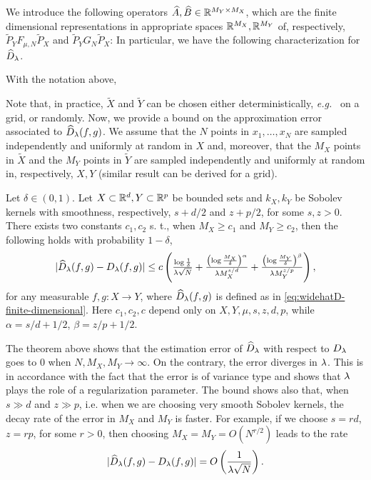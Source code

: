 We introduce the following operators $\widehat{A}, \widehat{B} \in \mathbb R^{M_Y \times M_X}$, which are the finite dimensional representations in appropriate spaces $\mathbb R^{M_X}, \mathbb R^{M_Y}$ of, respectively, $\tilde{P}_Y F_{\mu, N} \tilde{P}_X$ and $\tilde{P}_Y G_N \tilde{P}_X$:
In particular, we have the following characterization for $\widehat{D}_\lambda$.
\begin{lemma}\label{lm:widehatD}
With the notation above,
\end{lemma}

Note that, in practice, $\widetilde X$ and $\widetilde Y$ can be chosen either deterministically, \emph{e.g.\ } on a grid, or randomly. Now, we provide a bound on the approximation error associated to $\widehat{D}_\lambda(f,g)$. We assume that the $N$ points in $x_1,\dots, x_N$ are sampled independently and uniformly at random in $X$ and, moreover, that the $M_X$ points in $\widetilde{X}$ and the $M_Y$ points in $\widetilde{Y}$ are sampled independently and uniformly at random in, respectively, $X, Y$ (similar result can be derived for a grid).
\begin{theorem}\label{thm:appr-error-widehatD}
Let $\delta \in (0,1)$. Let $X \subset \mathbb R^d, Y \subset \mathbb R^p$ be bounded sets and $k_X, k_Y$ be Sobolev kernels with smoothness, respectively, $s + d/2$ and $z+p/2$, for some $s,z > 0$. There exists two constants $c_1, c_2$ s. t., when $M_X \geq c_1$ and $M_Y \geq c_2$, then the following holds with probability $1-\delta$,
$$|\widehat{D}_\lambda(f,g) - D_\lambda(f,g)| \leq c\left(\tfrac{\log\frac{1}{\delta}}{\lambda\sqrt{N}} + \tfrac{\left(\log \frac{M_X}{\delta}\right)^{\alpha}}{\lambda M_X^{s/d}} + \tfrac{\left(\log\frac{M_Y}{\delta}\right)^{\beta}}{\lambda M_Y^{z/p}}\right),$$
for any measurable $f,g : X \to Y$, where $\widehat{D}_\lambda(f,g)$ is defined as in \cref{eq:widehatD-finite-dimensional}. Here $c_1, c_2, c$ depend only on $X, Y, \mu, s, z, d, p$, while $\alpha = s/d+1/2$, $\beta = z/p+1/2$.
\end{theorem}

The theorem above shows that the estimation error of $\widehat{D}_\lambda$ with respect to $D_\lambda$ goes to $0$ when $N, M_X, M_Y \to \infty$. On the contrary, the error diverges in $\lambda$. This is in accordance with the fact that the error is of variance type and shows that $\lambda$ plays the role of a regularization parameter. The bound shows also that, when $s \gg d$ and $z \gg p$, i.e. when we are choosing very smooth Sobolev kernels, the decay rate of the error in $M_X$ and $M_Y$ is faster. For example, if we choose $s = r d$, $z = r p$, for some $r > 0$, then choosing $M_X = M_Y =  O(N^{r/2})$ leads to the rate
$$ |\widehat{D}_\lambda(f,g) - D_\lambda(f,g)| = O\left(\frac{1}{\lambda \sqrt{N}}\right).$$


